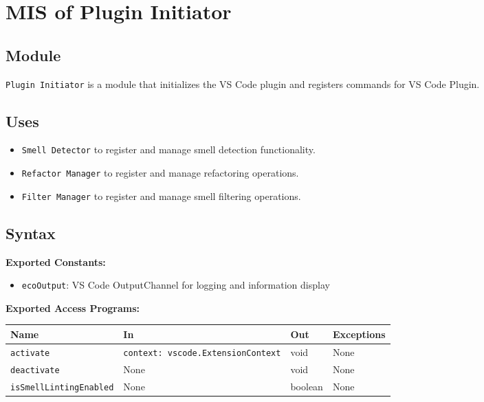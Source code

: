 \documentclass[12pt, titlepage]{article}
\begin{document}
\newpage

\section{MIS of Plugin Initiator}

\subsection{Module}
\texttt{Plugin Initiator} is a module that initializes the VS Code plugin and registers commands for VS Code Plugin.

\subsection{Uses}
\begin{itemize}
    \item \texttt{Smell Detector} to register and manage smell detection functionality.
    \item \texttt{Refactor Manager} to register and manage refactoring operations.
    \item \texttt{Filter Manager} to register and manage smell filtering operations.
\end{itemize}

\subsection{Syntax}

\textbf{Exported Constants:} 
\begin{itemize}
    \item \texttt{ecoOutput}: VS Code OutputChannel for logging and information display
\end{itemize}

\noindent \textbf{Exported Access Programs:}\\
\begin{tabularx}{\linewidth}{|l|>{\raggedright\arraybackslash}X|l|l|}
    \hline
    \textbf{Name} & \textbf{In} & \textbf{Out} & \textbf{Exceptions} \\
    \hline
    \texttt{activate} & \texttt{context: vscode.ExtensionContext} & void & None \\
    \hline
    \texttt{deactivate} & None & void & None \\
    \hline
    \texttt{isSmellLintingEnabled} & None & boolean & None \\
    \hline
\end{tabularx}
\end{document}
